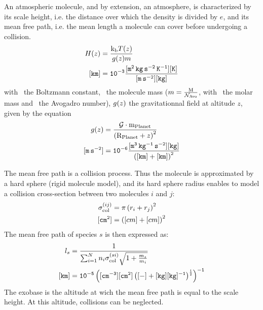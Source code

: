 An atmospheric molecule, and by extension, an atmosphere, is characterized by
its scale height, i.e. the distance over which the density is divided by $e$, and
its mean free path, i.e. the mean length a molecule can cover before undergoing
a collision.
\begin{equation}
\begin{split}
H(z)  &    = \frac{\text{k}_\text{b} T(z)}{g(z)m} \\
\tt [km] &\tt = 10^{-3} \frac{[\mathtt{m^2\,kg\,s^{-2}\,K^{-1}}] [K]}{[m\,s^{-2}][kg]} 
\end{split}
\label{scale_height}
\end{equation}
with \kb\ the Boltzmann constant, 
\mass\ the molecule mass ($m = \frac{\text{M}}{\mathcal{N}_\text{Avo}}$, with
\Mm\ the molar mass and \Nav\ the Avogadro number), 
$g(z)$ the gravitationnal field at altitude $z$, given by the equation
\begin{equation}
\begin{split}
g(z)        &     = \frac{\mathcal{G}\cdot\text{m}_\text{Planet}}{\left(\text{R}_\text{Planet} + z\right)^2} \\
\tt [m\,s^{-2}] & \tt = 10^{-6} \frac{[\mathtt{m^3\,kg^{-1}\,s^{-2}}] [kg]}{\left([km] + [km]\right)^2}
\end{split}
\label{gfield}
\end{equation}

The mean free path is a collision process. Thus the molecule is approximated
by a hard sphere (rigid molecule model), and its hard sphere radius enables
to model a collision cross-section between two molecules $i$ and $j$:
\begin{equation}
\begin{split}
\sigma^{(ij)}_\text{col} & = \pi\left(r_i + r_j\right)^2 \\
\tt [cm^2]               & = \left([cm] + [cm]\right)^2
\end{split}
\label{sigma_collision}
\end{equation}
The mean free path of species $s$ is then expressed as:
\begin{equation}
\begin{split}
l_s   &     = \frac{1}{\sum_{i=1}^{N}n_i\sigma^{(si)}_\text{col}\sqrt{1 + \frac{m_s}{m_i}}} \\
\tt [km] & \tt = 10^{-5}\left([cm^{-3}] [cm^2] \left([-] + [kg][kg]^{-1}\right)^{\frac{1}{2}}\right)^{-1}
\end{split}
\label{mean_free_path}
\end{equation}
The exobase is the altitude at wich the mean free path is equal to the scale height. At this
altitude, collisions can be neglected.
